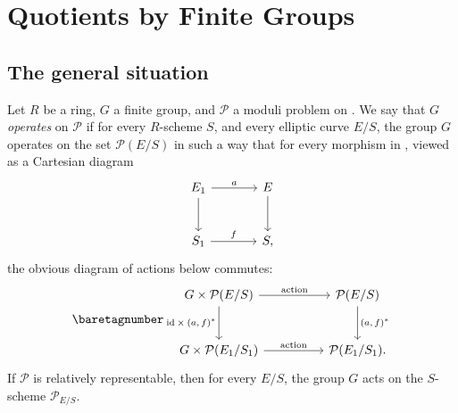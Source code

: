 \chapter{Quotients by Finite Groups}
\label{ch:7}

\section{The general situation}
\label{sec:7.1}

\kmitem\label{item:7.1.1}
Let $R$ be a ring, $G$ a finite group, and $\mathcal{P}$ a moduli problem on \EllR. We say that $G$ \emph{operates} on $\mathcal{P}$ if for every $R$-scheme $S$, and every elliptic curve $E/S$, the group $G$ operates on the set $\mathcal{P}(E/S)$ in such a way that for every morphism in \EllR, viewed as a Cartesian diagram
\[
\begin{tikzcd}[column sep=large, row sep=large]
E_1 \arrow[r, "a"] \arrow[d] & E \arrow[d] \\
S_1 \arrow[r, "f"] & S ,
\end{tikzcd}
\]
the obvious diagram of actions below commutes:
\begin{equation}\label{eq:7.1.1.1}\baretagnumber
\begin{tikzcd}[column sep=huge, row sep=large, every label/.append style={font=\scriptsize}]
G \times \mathcal{P}(E/S) \arrow[r, "\text{action}"] \arrow[d, "{\mathrm{id}\times(a,f)^*}"'] & \mathcal{P}(E/S) \arrow[d, "{(a,f)^*}"] \\
G \times \mathcal{P}(E_1/S_1) \arrow[r, "\text{action}"] & \mathcal{P}(E_1/S_1) .
\end{tikzcd}
\end{equation}
If $\mathcal{P}$ is relatively representable, then for every $E/S$, the group $G$ acts on the $S$-scheme $\mathcal{P}_{E/S}$.

